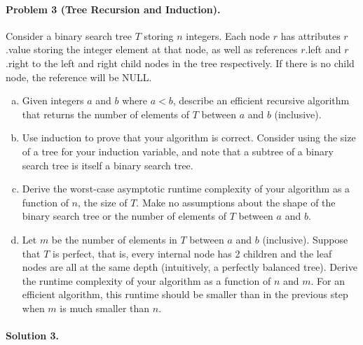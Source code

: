 \documentclass[11pt]{article}
\begin{document}

\newpage
\paragraph{Problem 3 (Tree Recursion and Induction).}
Consider a binary search tree $T$ storing $n$ integers. Each node $r$ has attributes $r$.value storing the integer element at that node, as well as references $r$.left and $r$.right to the left and right child nodes in the tree respectively. If there is no child node, the reference will be NULL.
\begin{enumerate}[(a)]
    \item Given integers $a$ and $b$ where $a < b$, describe an efficient recursive algorithm that returns the number of elements of $T$ between $a$ and $b$ (inclusive).
    
    \item Use induction to prove that your algorithm is correct. Consider using the size of a tree for your induction variable, and note that a subtree of a binary search tree is itself a binary search tree.
    
    \item Derive the worst-case asymptotic runtime complexity of your algorithm as a function of $n$, the size of $T$. Make no assumptions about the shape of the binary search tree or the number of elements of $T$ between $a$ and $b$.
    
    \item Let $m$ be the number of elements in $T$ between $a$ and $b$ (inclusive). Suppose that $T$ is perfect, that is, every internal node has 2 children and the leaf nodes are all at the same depth (intuitively, a perfectly balanced tree). Derive the runtime complexity of your algorithm as a function of $n$ and $m$. For an efficient algorithm, this runtime should be smaller than in the previous step when $m$ is much smaller than $n$.
\end{enumerate}

\paragraph{Solution 3.}
\end{document}
